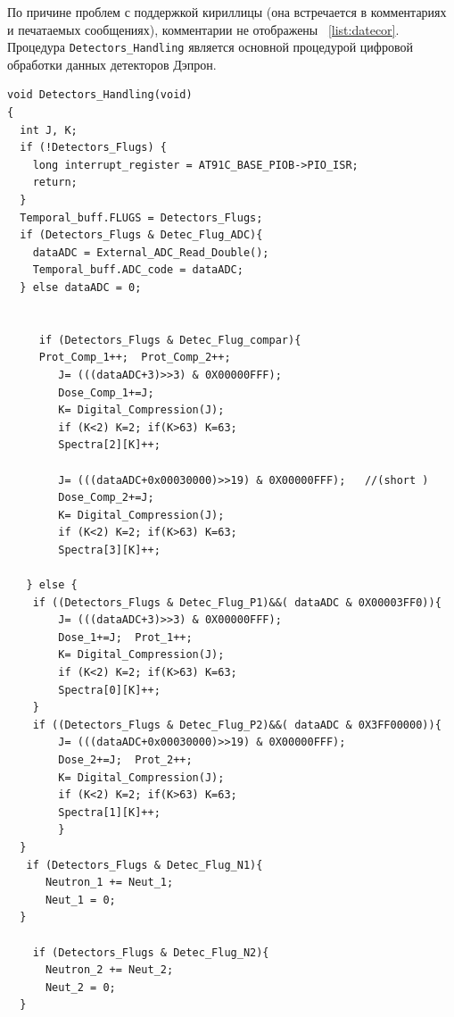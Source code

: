 По причине проблем с поддержкой кириллицы (она встречается в комментариях и
печатаемых сообщениях), комментарии не отображены ~\ref{list:datecor}.
Процедура \texttt{Detectors\_Handling} является основной процедурой цифровой обработки данных детекторов Дэпрон.
\label{list:Detectors_Handling}
\begin{lstlisting}[language={[ISO]C++}]
void Detectors_Handling(void)
{  
  int J, K;
  if (!Detectors_Flugs) {
    long interrupt_register = AT91C_BASE_PIOB->PIO_ISR;    
    return;
  }  
  Temporal_buff.FLUGS = Detectors_Flugs;
  if (Detectors_Flugs & Detec_Flug_ADC){
    dataADC = External_ADC_Read_Double();
    Temporal_buff.ADC_code = dataADC;
  } else dataADC = 0;

	
     if (Detectors_Flugs & Detec_Flug_compar){
     Prot_Comp_1++;  Prot_Comp_2++;  
        J= (((dataADC+3)>>3) & 0X00000FFF);
        Dose_Comp_1+=J;
        K= Digital_Compression(J);
        if (K<2) K=2; if(K>63) K=63;
        Spectra[2][K]++;
    
        J= (((dataADC+0x00030000)>>19) & 0X00000FFF);   //(short )
        Dose_Comp_2+=J;
        K= Digital_Compression(J);
        if (K<2) K=2; if(K>63) K=63;
        Spectra[3][K]++;

   } else {
	if ((Detectors_Flugs & Detec_Flug_P1)&&( dataADC & 0X00003FF0)){
        J= (((dataADC+3)>>3) & 0X00000FFF);
        Dose_1+=J;  Prot_1++;
        K= Digital_Compression(J);
        if (K<2) K=2; if(K>63) K=63;
        Spectra[0][K]++;
	}
	if ((Detectors_Flugs & Detec_Flug_P2)&&( dataADC & 0X3FF00000)){
        J= (((dataADC+0x00030000)>>19) & 0X00000FFF);
        Dose_2+=J;  Prot_2++;
        K= Digital_Compression(J);
        if (K<2) K=2; if(K>63) K=63;
        Spectra[1][K]++;
        }
  }
   if (Detectors_Flugs & Detec_Flug_N1){      
      Neutron_1 += Neut_1;
      Neut_1 = 0;
  } 
 
    if (Detectors_Flugs & Detec_Flug_N2){       
      Neutron_2 += Neut_2; 
      Neut_2 = 0;
  } 


\end{lstlisting}
